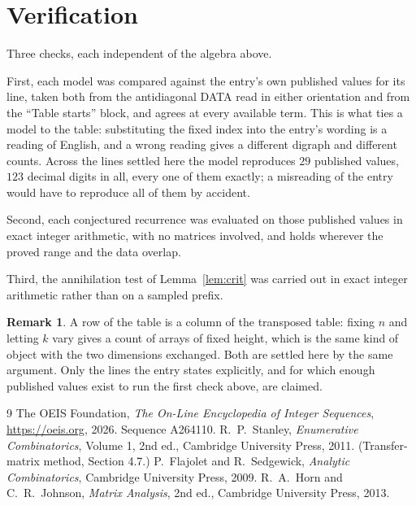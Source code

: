 \documentclass[11pt,a4paper]{article}
\theoremstyle{plain}
\theoremstyle{definition}
\newtheorem{remark}[theorem]{Remark}
\begin{document}
\section{Verification}

Three checks, each independent of the algebra above.

First, each model was compared against the entry's own published values for its line, taken
both from the antidiagonal DATA read in either orientation and from the ``Table starts''
block, and agrees at every available term. This is what ties a model to the table:
substituting the fixed index into the entry's wording is a reading of English, and a wrong
reading gives a different digraph and different counts. Across the lines settled here the
model reproduces $29$ published values, $123$ decimal digits in all, every one of
them exactly; a misreading of the entry would have to reproduce all of them by accident.

Second, each conjectured recurrence was evaluated on those published values in exact
integer arithmetic, with no matrices involved, and holds wherever the proved range and the
data overlap.

Third, the annihilation test of Lemma~\ref{lem:crit} was carried out in exact integer
arithmetic rather than on a sampled prefix.

\begin{remark}
A row of the table is a column of the transposed table: fixing $n$ and letting $k$ vary gives a
count of arrays of fixed height, which is the same kind of object with the two dimensions
exchanged. Both are settled here by the same argument. Only the lines the entry states
explicitly, and for which enough published values exist to run the first check above, are
claimed.
\end{remark}

\begin{thebibliography}{9}
 The OEIS Foundation, \emph{The On-Line Encyclopedia of Integer
Sequences}, \url{https://oeis.org}, 2026. Sequence A264110.
 R.~P.~Stanley, \emph{Enumerative Combinatorics}, Volume 1, 2nd ed.,
Cambridge University Press, 2011. (Transfer-matrix method, Section 4.7.)
 P.~Flajolet and R.~Sedgewick, \emph{Analytic Combinatorics}, Cambridge
University Press, 2009.
 R.~A.~Horn and C.~R.~Johnson, \emph{Matrix Analysis}, 2nd ed., Cambridge
University Press, 2013.
\end{thebibliography}
\end{document}
